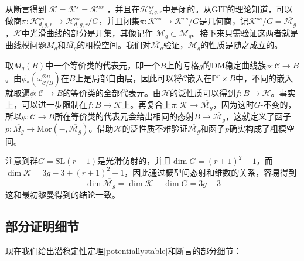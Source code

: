 从断言得到 $ \mathcal{K}=\mathcal{K}^s=\mathcal{K}^{ss}$ ，并且在$ \mathcal{H}_{d,g,r}^{ss} $中是闭的。从GIT的理论知道，可以做商$ \pi:\mathcal{H}_{d,g,r}^{ss}\to\mathcal{H}_{d,g,r}^{ss}/G $，并且闭集$ \pi:\mathcal{K}^{ss}\to \mathcal{K}^{ss}/G $是几何商，记$\mathcal{K}^{ss}/G= \overline{\mathcal{M}_{g}} $，$ \mathcal{K} $中光滑曲线的部分是开集，其像记作 $ \mathcal{M}_g\subset \overline{\mathcal{M}_{g}} $。接下来只需验证这两者就是曲线模问题$ M_g $和$ \overline{M_g} $的粗模空间。我们对$ \overline{\mathcal{M}_g} $验证，$ \mathcal{M}_g $的性质是随之成立的。

取$ \overline{M_g}(B) $中一个等价类的代表元，即一个$ B $上的亏格$ g $的DM稳定曲线族$ \phi:\mathcal{C}\to B $。由$ \phi_*(\omega_{\mathcal{C}/B}^{\otimes n}) $在$ B $上是局部自由层，因此可以将$ \mathcal{C} $嵌入在$ \mathbb{P}^r \times B$中，不同的嵌入就取遍$ \phi:\mathcal{C}\to B $的等价类的全部代表元。由$ \mathcal{H} $的泛性质可以得到$ f: B\to \mathcal{H} $。事实上，可以进一步限制在$ f:B\to \mathcal{K} $上。再复合上$ \pi: \mathcal{K}\to \overline{\mathcal{M}_g} $，因为这时$ G $-不变的，所以$ \phi:\mathcal{C}\to B $所在等价类的代表元会给出相同的态射$ B\to  \overline{\mathcal{M}_g} $，这就定义了函子$ p:\overline{M_g}\to \mathrm{Mor}(-,\overline{\mathcal{M}_g}) $。借助$ \mathcal{H} $的泛性质不难验证$ \overline{\mathcal{M}_g} $和函子$ p $确实构成了粗模空间。

注意到群$ G=\mathrm{SL}(r+1) $是光滑仿射的，并且$ \dim G=(r+1)^2-1 $，而$ \dim \mathcal{K}=3g-3+(r+1)^2-1 $，因此通过概型间态射和维数的关系，容易得到
$$ \dim \overline{\mathcal{M}_g}=\dim \mathcal{K}-\dim G=3g-3 $$
这和最初黎曼得到的结论一致。

\subsection{部分证明细节} 
现在我们给出潜稳定性定理\ref{potentiallystable}和断言的部分细节：


